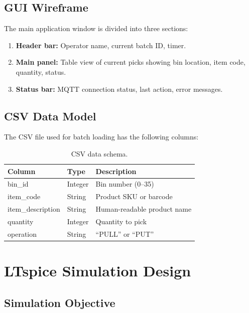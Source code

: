 \subsection{GUI Wireframe}
\label{sec:gui}

The main application window is divided into three sections:

\begin{enumerate}
  \item \textbf{Header bar:} Operator name, current batch ID, timer.
  \item \textbf{Main panel:} Table view of current picks showing bin location, item code, quantity, status.
  \item \textbf{Status bar:} MQTT connection status, last action, error messages.
\end{enumerate}

\subsection{CSV Data Model}
\label{sec:csv}

The CSV file used for batch loading has the following columns:

\begin{table}[H]
  \centering
  \caption{CSV data schema.}
  \label{tab:csv}
  \begin{tabular}{p{3cm} p{2.5cm} p{6cm}}
    \toprule
    \textbf{Column} & \textbf{Type} & \textbf{Description} \\
    \midrule
    bin\_id & Integer & Bin number (0--35) \\
    item\_code & String & Product SKU or barcode \\
    item\_description & String & Human-readable product name \\
    quantity & Integer & Quantity to pick \\
    operation & String & ``PULL'' or ``PUT'' \\
    \bottomrule
  \end{tabular}
\end{table}

\section{LTspice Simulation Design}
\label{sec:ltspice-design}

\subsection{Simulation Objective}
\label{sec:ltspice-objective}

